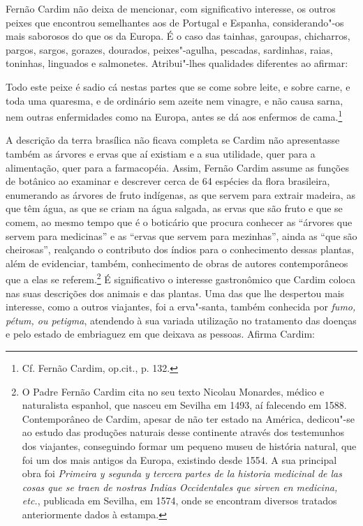 Fernão Cardim não deixa de mencionar, com significativo interesse, os
outros peixes que encontrou semelhantes aos de Portugal e Espanha,
considerando"-os mais saborosos do que os da Europa. É o caso das
tainhas, garoupas, chicharros, pargos, sargos, gorazes,
dourados, peixes"-agulha, pescadas, sardinhas, raias, toninhas, linguados
e salmonetes. Atribui"-lhes qualidades diferentes ao afirmar:

\begin{hedraquote}
Todo este peixe é sadio cá nestas partes que se come sobre
leite, e sobre carne, e toda uma quaresma, e de ordinário sem azeite
nem vinagre, e não causa sarna, nem outras enfermidades como na Europa,
antes se dá aos enfermos de cama.\footnote{ Cf. Fernão Cardim, op.cit., p. 132.} 
\end{hedraquote}

A descrição da terra brasílica não ficava completa se Cardim não
apresentasse também as árvores e ervas que aí existiam e a sua
utilidade, quer para a alimentação, quer para a farmacopéia. Assim,
Fernão Cardim assume as funções de botânico ao examinar e descrever
cerca de 64 espécies da flora brasileira, enumerando as
árvores de fruto indígenas, as que servem para extrair madeira, as que
têm água, as que se criam na água salgada, as ervas que são fruto e que
se comem, ao mesmo tempo que é o boticário que procura conhecer as
``árvores que servem para medicinas'' e as ``ervas que
servem para mezinhas'', ainda as ``que são cheirosas'', 
realçando o contributo dos índios para o conhecimento dessas plantas,
além de evidenciar, também, conhecimento de obras de autores
contemporâneos que a elas se referem.\footnote{ O Padre Fernão
Cardim cita no seu texto Nicolau Monardes, médico e naturalista
espanhol, que nasceu em Sevilha em 1493, aí falecendo em 1588.
Contemporâneo de Cardim, apesar de não ter estado na América,
dedicou"-se ao estudo das produções naturais desse continente através
dos testemunhos dos viajantes, conseguindo formar um pequeno museu de
história natural, que foi um dos mais antigos da Europa, existindo
desde 1554. A sua principal obra foi \textit{Primeira y segunda y
tercera partes de la historia medicinal de las cosas que se traen de
nostras Indias Occidentales que sirven en medicina, etc.}, publicada em
Sevilha, em 1574, onde se encontram diversos tratados anteriormente
dados à estampa.} É significativo o interesse gastronômico que Cardim
coloca nas suas descrições dos animais e das plantas. Uma das que lhe
despertou mais interesse, como a outros viajantes, foi a
erva"-santa, também conhecida por \textit{fumo, pétum, ou
petigma}, atendendo à sua variada utilização no tratamento das doenças
e pelo estado de embriaguez em que deixava as pessoas. Afirma Cardim:

